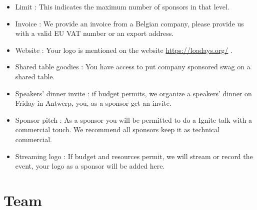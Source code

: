 \begin{itemize}
\item
Limit : This indicates the maximum number of sponsors in that level.
\item
Invoice : We provide an invoice from a Belgian company, please provide us with a valid EU VAT number or an export address.
\item
Website : Your logo is mentioned on the website \url{https://loadays.org/} .
\item
Shared table goodies : You have access to put company sponsored swag on a shared table.
\item
Speakers' dinner invite : if budget permits, we organize a speakers' dinner on Friday in Antwerp, you, as a sponsor get an invite.
\item
Sponsor pitch : As a sponsor you will be permitted to do a Ignite talk with a commercial touch. We recommend all sponsors keep it as technical commercial.
\item
Streaming logo : If budget and resources permit, we will stream or record the event, your logo as a sponsor will be added here.
\end{itemize}

\section{Team}



